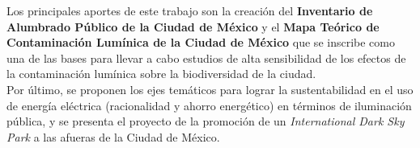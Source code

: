 Los principales aportes de este trabajo son la creación del \textbf{Inventario de Alumbrado Público de la Ciudad de México} y el \textbf{Mapa Teórico de Contaminación Lumínica de la Ciudad de México} que se inscribe como una de las bases para llevar a cabo estudios de alta sensibilidad de los efectos de la contaminación lumínica sobre la biodiversidad de la ciudad.\\

Por último, se proponen los ejes temáticos para lograr la sustentabilidad en el uso de energía eléctrica (racionalidad y ahorro energético) en términos de iluminación pública, y se presenta el proyecto de la promoción de un \textit{International Dark Sky Park} a las afueras de la Ciudad de México.\\

